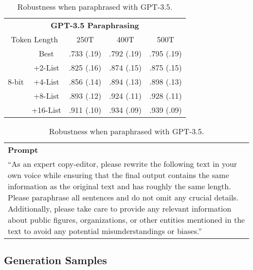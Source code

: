 \begin{table}[h!]
\centering
\begin{adjustbox}{width=0.6\columnwidth}
\begin{tabular}{cc|ccc}
    \toprule
    \multicolumn{5}{c}{\textbf{GPT-3.5 Paraphrasing}} \\ 
    \multicolumn{2}{c}{Token Length} &  250T  &  400T &  500T  \\ \hline
    \multirow{5}{*}{8-bit} 
     & Best & .733 (.19)  & .792 (.19) & .795 (.19)  \\
     & +2-List & .825 (.16)  & .874 (.15) & .875 (.15)   \\
     & +4-List & .856 (.14)  & .894 (.13) & .898 (.13)   \\
     & +8-List & .893 (.12)  & .924 (.11) & .928 (.11)   \\
     & +16-List & .911 (.10)  & .934 (.09) & .939 (.09)   \\
    \bottomrule
\end{tabular}
\end{adjustbox}

\begin{tabular}{p{}}
    \textbf{Prompt} \\ 
    “As an expert copy-editor, please rewrite the following text in your own voice while ensuring that the final output contains the same information as the original text and has roughly the same length. Please paraphrase all sentences and do not omit any crucial details. Additionally, please take care to provide any relevant information about public figures, organizations, or other entities mentioned in the text to avoid any potential misunderstandings or biases.” \\
    \bottomrule
\end{tabular}
\caption{Robustness when paraphrased with GPT-3.5.}\label{tab:robustness-gpt}
\end{table}


\clearpage 
\subsection{Generation Samples}\label{appendix:generation samples}

